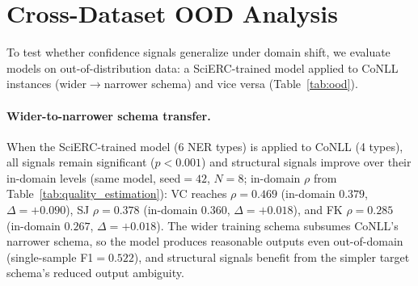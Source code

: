 \section{Cross-Dataset OOD Analysis}\label{app:ood}

To test whether confidence signals generalize under domain shift, we evaluate models on out-of-distribution data: a SciERC-trained model applied to CoNLL instances (wider$\to$narrower schema) and vice versa (Table~\ref{tab:ood}).

\begin{table}[t]
\centering
\small
\caption{Cross-dataset OOD quality estimation (Spearman $\rho$, Qwen3-8B, $N{=}8$, $T{=}1.0$, seed${=}42$). SciERC$\to$CoNLL: SciERC-trained model on CoNLL instances ($n{=}2756$). CoNLL$\to$SciERC: CoNLL-trained model on SciERC instances ($n{=}529$, excluded from conclusions due to catastrophic model failure). In-domain $\rho$ from Table~\ref{tab:quality_estimation} (same model, same seed). \textsuperscript{***}$p{<}0.001$, \textsuperscript{*}$p{<}0.05$.}
\label{tab:ood}
\end{table}

\paragraph{Wider-to-narrower schema transfer.}
When the SciERC-trained model (6 NER types) is applied to CoNLL (4 types), all signals remain significant ($p{<}0.001$) and structural signals improve over their in-domain levels (same model, seed${=}42$, $N{=}8$; in-domain $\rho$ from Table~\ref{tab:quality_estimation}): VC reaches $\rho{=}0.469$ (in-domain $0.379$, $\Delta{=}{+}0.090$), SJ $\rho{=}0.378$ (in-domain $0.360$, $\Delta{=}{+}0.018$), and FK $\rho{=}0.285$ (in-domain $0.267$, $\Delta{=}{+}0.018$).
The wider training schema subsumes CoNLL's narrower schema, so the model produces reasonable outputs even out-of-domain (single-sample F1${=}0.522$), and structural signals benefit from the simpler target schema's reduced output ambiguity.

